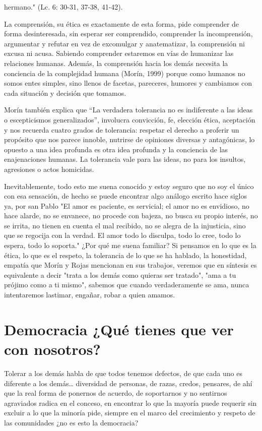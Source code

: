 hermano." (Lc. 6: 30-31, 37-38, 41-42).

La comprensión, su ética es exactamente de esta forma, pide comprender de forma desinteresada, sin esperar ser comprendido, comprender la incomprensión, argumentar y refutar en vez de excomulgar y anatematizar, la comprensión ni excusa ni acusa. Sabiendo comprender estaremos en vías de humanizar las relaciones humanas. Además, la comprensión hacia los demás necesita la conciencia de la complejidad humana (Morín, 1999) porque como humanos no somos entes simples, sino llenos de facetas, pareceres, humores y cambiamos con cada situación y decisión que tomamos.

Morín también explica que “La verdadera tolerancia no es indiferente a las ideas o escepticismos generalizados”, involucra convicción, fe, elección ética, aceptación y nos recuerda cuatro grados de tolerancia: respetar el derecho a proferir un propósito que nos parece innoble, nutrirse de opiniones diversas y antagónicas, lo opuesto a una idea profunda es otra idea profunda y la conciencia de las enajenaciones humanas. La tolerancia vale para las ideas, no para los insultos, agresiones o actos homicidas.

Inevitablemente, todo esto me suena conocido y estoy seguro que no soy el único con esa sensación, de hecho se puede encontrar algo análogo escrito hace siglos ya, por san Pablo "El amor es paciente, es servicial; el amor no es envidioso, no hace alarde, no se envanece, no procede con bajeza, no busca su propio interés, no se irrita, no tienen en cuenta el mal recibido, no se alegra de la injusticia, sino que se regocija con la verdad. El amor todo lo disculpa, todo lo cree, todo lo espera, todo lo soporta." ¿Por qué me suena familiar? Si pensamos en lo que es la ética, lo que es el respeto, la tolerancia de lo que se ha hablado, la honestidad, empatía que Morín y Rojas mencionan en sus trabajos, veremos que en síntesis es equivalente a decir "trata a los demás como quieras ser tratado", "ama a tu prójimo como a ti mismo", sabemos que cuando verdaderamente se ama, nunca intentaremos lastimar, engañar, robar a quien amamos.
\section{Democracia ¿Qué tienes que ver con nosotros?}
Tolerar a los demás habla de que todos tenemos defectos, de que cada uno es diferente a los demás… diversidad de personas, de razas, credos, pensares, de ahí que la real forma de ponernos de acuerdo, de soportarnos y no sentirnos agraviados radica en el conceso, en encontrar lo que la mayoría puede requerir sin excluir a lo que la minoría pide, siempre en el marco del crecimiento y respeto de las comunidades ¿no es esto la democracia?

